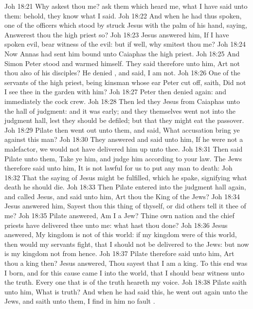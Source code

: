 \vs Joh 18:21 Why askest thou me? ask them which heard me, what I have said unto them: behold, they know what I said.
\vs Joh 18:22 And when he had thus spoken, one of the officers which stood by struck Jesus with the palm of his hand, saying, Answerest thou the high priest so?
\vs Joh 18:23 Jesus answered him, If I have spoken evil, bear witness of the evil: but if well, why smitest thou me?
\vs Joh 18:24 Now Annas had sent him bound unto Caiaphas the high priest.
\vs Joh 18:25 And Simon Peter stood and warmed himself. They said therefore unto him, Art not thou also  of his disciples? He denied , and said, I am not.
\vs Joh 18:26 One of the servants of the high priest, being  kinsman whose ear Peter cut off, saith, Did not I see thee in the garden with him?
\vs Joh 18:27 Peter then denied again: and immediately the cock crew.
\vs Joh 18:28 Then led they Jesus from Caiaphas unto the hall of judgment: and it was early; and they themselves went not into the judgment hall, lest they should be defiled; but that they might eat the passover.
\vs Joh 18:29 Pilate then went out unto them, and said, What accusation bring ye against this man?
\vs Joh 18:30 They answered and said unto him, If he were not a malefactor, we would not have delivered him up unto thee.
\vs Joh 18:31 Then said Pilate unto them, Take ye him, and judge him according to your law. The Jews therefore said unto him, It is not lawful for us to put any man to death:
\vs Joh 18:32 That the saying of Jesus might be fulfilled, which he spake, signifying what death he should die.
\vs Joh 18:33 Then Pilate entered into the judgment hall again, and called Jesus, and said unto him, Art thou the King of the Jews?
\vs Joh 18:34 Jesus answered him, Sayest thou this thing of thyself, or did others tell it thee of me?
\vs Joh 18:35 Pilate answered, Am I a Jew? Thine own nation and the chief priests have delivered thee unto me: what hast thou done?
\vs Joh 18:36 Jesus answered, My kingdom is not of this world: if my kingdom were of this world, then would my servants fight, that I should not be delivered to the Jews: but now is my kingdom not from hence.
\vs Joh 18:37 Pilate therefore said unto him, Art thou a king then? Jesus answered, Thou sayest that I am a king. To this end was I born, and for this cause came I into the world, that I should bear witness unto the truth. Every one that is of the truth heareth my voice.
\vs Joh 18:38 Pilate saith unto him, What is truth? And when he had said this, he went out again unto the Jews, and saith unto them, I find in him no fault .
